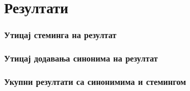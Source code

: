 \chapter{Резултати}
\subsection{Утицај стеминга на резултат}
\subsection{Утицај додавања синонима на резултат}
\subsection{Укупни резултати са синонимима и стемингом}
